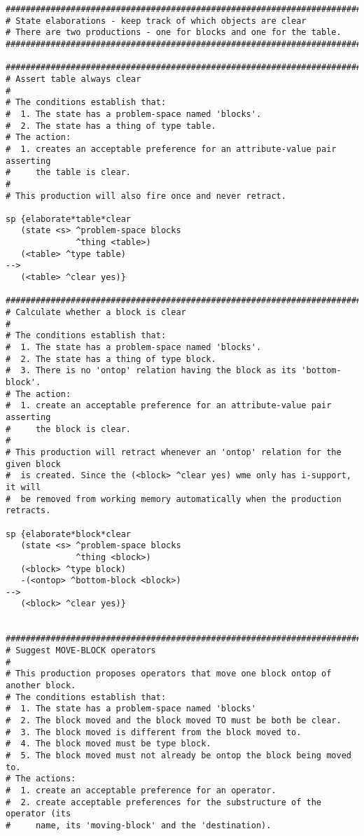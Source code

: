 \begin{verbatim}
###############################################################################
# State elaborations - keep track of which objects are clear
# There are two productions - one for blocks and one for the table.
###############################################################################

###############################################################################
# Assert table always clear
#
# The conditions establish that:
#  1. The state has a problem-space named 'blocks'.
#  2. The state has a thing of type table.
# The action:
#  1. creates an acceptable preference for an attribute-value pair asserting
#     the table is clear.
#
# This production will also fire once and never retract.

sp {elaborate*table*clear
   (state <s> ^problem-space blocks
              ^thing <table>)
   (<table> ^type table)
-->
   (<table> ^clear yes)}

###############################################################################
# Calculate whether a block is clear
#
# The conditions establish that:
#  1. The state has a problem-space named 'blocks'.
#  2. The state has a thing of type block.
#  3. There is no 'ontop' relation having the block as its 'bottom-block'.
# The action:
#  1. create an acceptable preference for an attribute-value pair asserting
#     the block is clear.
#
# This production will retract whenever an 'ontop' relation for the given block
#  is created. Since the (<block> ^clear yes) wme only has i-support, it will
#  be removed from working memory automatically when the production retracts.

sp {elaborate*block*clear
   (state <s> ^problem-space blocks
              ^thing <block>)
   (<block> ^type block)
   -(<ontop> ^bottom-block <block>)
-->
   (<block> ^clear yes)}


###############################################################################
# Suggest MOVE-BLOCK operators
#
# This production proposes operators that move one block ontop of another block.  
# The conditions establish that:
#  1. The state has a problem-space named 'blocks'
#  2. The block moved and the block moved TO must be both be clear.
#  3. The block moved is different from the block moved to.
#  4. The block moved must be type block.
#  5. The block moved must not already be ontop the block being moved to.
# The actions:
#  1. create an acceptable preference for an operator.
#  2. create acceptable preferences for the substructure of the operator (its
#     name, its 'moving-block' and the 'destination).


\end{verbatim}
